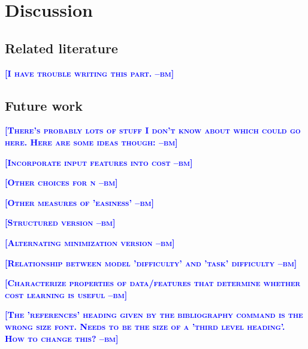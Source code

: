 \documentclass{article} %
\newcommand{\bmcomment}[1]{\textcolor{blue}{\textsc{\textbf{[#1 --bm]}}}}
\begin{document}
\section{Discussion}

\subsection{Related literature}

\bmcomment{I have trouble writing this part.}

\subsection{Future work}

\bmcomment{There's probably lots of stuff I don't know about
which could go here.  Here are some ideas though:}

\bmcomment{Incorporate input features into cost}

\bmcomment{Other choices for n}

\bmcomment{Other measures of 'easiness'}

\bmcomment{Structured version}

\bmcomment{Alternating minimization version}

\bmcomment{Relationship between model 'difficulty' and 'task' difficulty}

\bmcomment{Characterize properties of data/features that determine whether cost learning is useful}



\bmcomment{The 'references' heading given by the 
bibliography command is the wrong size font.  Needs to
be the size of a 'third level heading'.  How to change this?}



%
%


\end{document}
